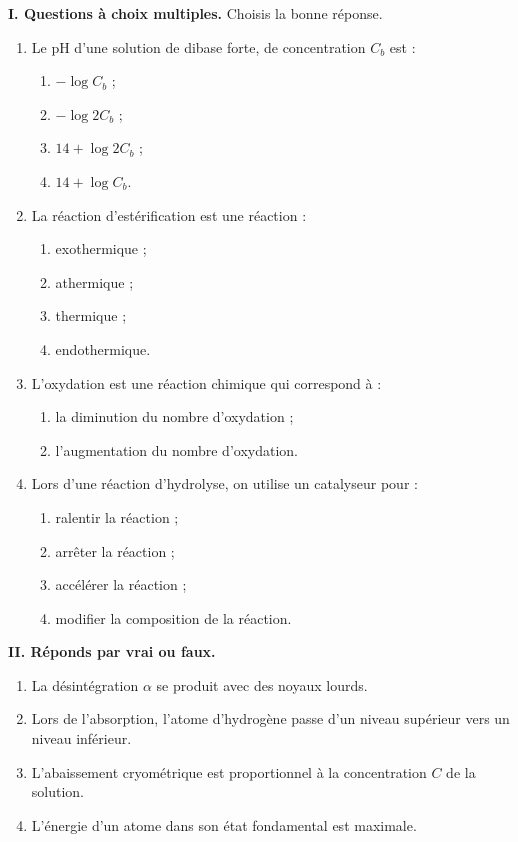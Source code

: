 \documentclass[11pt]{article}
\begin{document}



\noindent\textbf{I. Questions à choix multiples.} Choisis la bonne réponse.

\begin{enumerate}
  \item Le pH d'une solution de dibase forte, de concentration $C_b$ est :
  \begin{enumerate}[label=\alph*)]
    \item $-\log C_b$ ;
    \item $-\log 2C_b$ ;
    \item $14 + \log 2C_b$ ;
    \item $14 + \log C_b$.
  \end{enumerate}
  \item La réaction d'estérification est une réaction :
  \begin{enumerate}[label=\alph*)]
    \item exothermique ;
    \item athermique ;
    \item thermique ;
    \item endothermique.
  \end{enumerate}
  \item L'oxydation est une réaction chimique qui correspond à :
  \begin{enumerate}[label=\alph*)]
    \item la diminution du nombre d'oxydation ;
    \item l'augmentation du nombre d'oxydation.
  \end{enumerate}
  \item Lors d'une réaction d'hydrolyse, on utilise un catalyseur pour :
  \begin{enumerate}[label=\alph*)]
    \item ralentir la réaction ;
    \item arrêter la réaction ;
    \item accélérer la réaction ;
    \item modifier la composition de la réaction.
  \end{enumerate}
\end{enumerate}

\noindent\textbf{II. Réponds par vrai ou faux.}
\begin{enumerate}
  \item La désintégration $\alpha$ se produit avec des noyaux lourds.
  \item Lors de l'absorption, l'atome d'hydrogène passe d'un niveau supérieur vers un niveau inférieur.
  \item L'abaissement cryométrique est proportionnel à la concentration $C$ de la solution.
  \item L'énergie d'un atome dans son état fondamental est maximale.
\end{enumerate}
\end{document}
